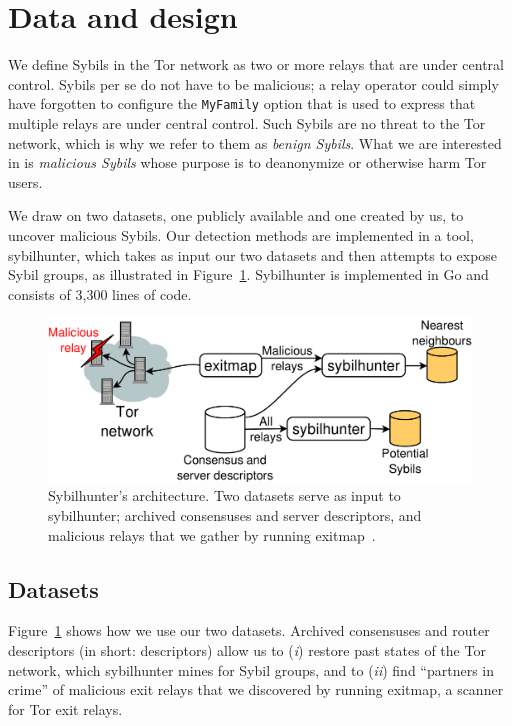 \section{Data and design}
\label{sec:design}
We define Sybils in the Tor network as two or more relays that are under central
control.  Sybils per se do not have to be malicious; a relay operator could
simply have forgotten to configure the \texttt{MyFamily} option that is used to
express that multiple relays are under central control.  Such Sybils are no
threat to the Tor network, which is why we refer to them as \emph{benign
Sybils}.  What we are interested in is \emph{malicious Sybils} whose purpose is
to deanonymize or otherwise harm Tor users.

We draw on two datasets, one publicly available and one created by us, to
uncover malicious Sybils.  Our detection methods are implemented in a tool,
sybilhunter, which takes as input our two datasets and then attempts to expose
Sybil groups, as illustrated in Figure~\ref{fig:system}.  Sybilhunter is
implemented in Go and consists of 3,300 lines of code.

\begin{figure}[t]
	\centering
	\includegraphics[width=\linewidth]{diagrams/system_architecture.pdf}
	\caption{Sybilhunter's architecture.  Two datasets serve as input to
		sybilhunter; archived consensuses and server descriptors, and malicious
		relays that we gather by running exitmap~\cite{Winter2014a}.}
	\label{fig:system}
\end{figure}

\subsection{Datasets}
\label{sec:datasets}
Figure~\ref{fig:system} shows how we use our two datasets.  Archived consensuses
and router descriptors (in short: descriptors) allow us to (\emph{i}) restore
past states of the Tor network, which sybilhunter mines for Sybil groups, and to
(\emph{ii}) find ``partners in crime'' of malicious exit relays that we
discovered by running exitmap, a scanner for Tor exit relays.

